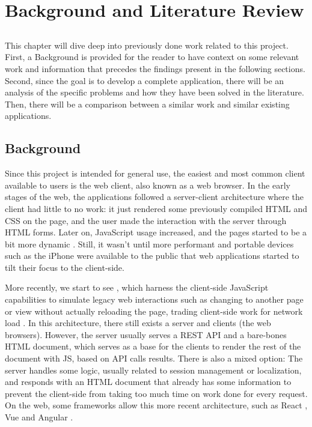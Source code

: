 \chapter{Background and Literature Review} \label{chap:sota}

\section*{}

This chapter will dive deep into previously done work related to this project. First, a Background is provided for the reader to have context on some relevant work and information that precedes the findings present in the following sections. Second, since the goal is to develop a complete application, there will be an analysis of the specific problems and how they have been solved in the literature. Then, there will be a comparison between a similar work and similar existing applications.

\section{Background}

Since this project is intended for general use, the easiest and most common client available to users is the web client, also known as a web browser. In the early stages of the web, the applications followed a server-client architecture where the client had little to no work: it just rendered some previously compiled HTML and CSS on the page, and the user made the interaction with the server through HTML forms. Later on, JavaScript usage increased, and the pages started to be a bit more dynamic \cite{ShklarRosen09}. Still, it wasn't until more performant and portable devices such as the iPhone were available to the public that web applications started to tilt their focus to the client-side. 

More recently, we start to see , which harness the client-side JavaScript capabilities to simulate legacy web interactions such as changing to another page or view without actually reloading the page, trading client-side work for network load \cite{Lugo-Cordero2015} \cite{Derezinska2020} \cite{Mesbah2007} \cite{Mesbah2007a}. In this architecture, there still exists a server and clients (the web browsers). However, the server usually serves a REST API and a bare-bones HTML document, which serves as a base for the clients to render the rest of the document with JS, based on API calls results. There is also a mixed option: The server handles some logic, usually related to session management or localization, and responds with an HTML document that already has some information to prevent the client-side from taking too much time on work done for every request. On the web, some frameworks allow this more recent architecture, such as React \cite{React}, Vue \cite{Vue} and Angular \cite{Angular}.

